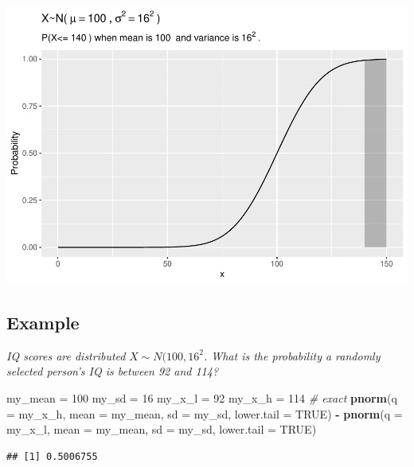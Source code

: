 \documentclass[]{book}
\newenvironment{Shaded}{\begin{snugshade}}{\end{snugshade}}
\newcommand{\CommentTok}[1]{\textcolor[rgb]{0.56,0.35,0.01}{\textit{#1}}}
\newcommand{\DataTypeTok}[1]{\textcolor[rgb]{0.13,0.29,0.53}{#1}}
\newcommand{\DecValTok}[1]{\textcolor[rgb]{0.00,0.00,0.81}{#1}}
\newcommand{\KeywordTok}[1]{\textcolor[rgb]{0.13,0.29,0.53}{\textbf{#1}}}
\newcommand{\NormalTok}[1]{#1}
\newcommand{\OperatorTok}[1]{\textcolor[rgb]{0.81,0.36,0.00}{\textbf{#1}}}
\newcommand{\OtherTok}[1]{\textcolor[rgb]{0.56,0.35,0.01}{#1}}
\newcommand{\StringTok}[1]{\textcolor[rgb]{0.31,0.60,0.02}{#1}}
\begin{document}
\includegraphics{data-sci_files/figure-latex/unnamed-chunk-14-1.pdf}

\hypertarget{example-2}{%
\subsection{Example}\label{example-2}}

\emph{IQ scores are distributed }\(X \sim N(100, 16^2\)\emph{. What is the probability a randomly selected person's IQ is between 92 and 114?}

\begin{Shaded}
\begin{Highlighting}[]
\NormalTok{my_mean =}\StringTok{ }\DecValTok{100}
\NormalTok{my_sd =}\StringTok{ }\DecValTok{16}
\NormalTok{my_x_l =}\StringTok{ }\DecValTok{92}
\NormalTok{my_x_h =}\StringTok{ }\DecValTok{114}
\CommentTok{# exact}
\KeywordTok{pnorm}\NormalTok{(}\DataTypeTok{q =}\NormalTok{ my_x_h, }\DataTypeTok{mean =}\NormalTok{ my_mean, }\DataTypeTok{sd =}\NormalTok{ my_sd, }\DataTypeTok{lower.tail =} \OtherTok{TRUE}\NormalTok{) }\OperatorTok{-}
\StringTok{  }\KeywordTok{pnorm}\NormalTok{(}\DataTypeTok{q =}\NormalTok{ my_x_l, }\DataTypeTok{mean =}\NormalTok{ my_mean, }\DataTypeTok{sd =}\NormalTok{ my_sd, }\DataTypeTok{lower.tail =} \OtherTok{TRUE}\NormalTok{)}
\end{Highlighting}
\end{Shaded}

\begin{verbatim}
## [1] 0.5006755
\end{verbatim}
\end{document}
